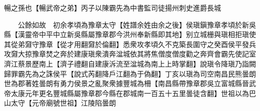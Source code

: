 暢之孫也【暢武帝之弟】丙子以陳霸先為中書監司徒揚州刺史進爵長城

　　公餘如故　初余孝頃為豫章太守【姓譜余姓由余之後】侯瑱鎭豫章孝頃於新吳縣【漢靈帝中平中立新吳縣屬豫章郡今洪州奉新縣即其地】别立城栅與瑱相拒瑱使其從弟奫守豫章【從才用翻奫於倫翻】悉衆攻孝頃久不克築長圍守之癸酉侯平發兵攻奫大掠豫章焚之奔於建康瑱衆潰奔湓城依其將焦僧度僧度勸之奔齊會霸先使記室濟江蔡景歷南上【濟子禮翻自建康泝流至湓城為南上上時掌翻】說瑱令降瑱乃詣闕歸罪霸先為之誅侯平【說式芮翻降戶江翻為于偽翻】丁亥以瑱為司空南昌民熊曇朗世為郡著姓曇朗有勇力侯景之亂聚衆據豐城為柵【南昌縣帶豫章郡吳立富城縣晉武帝太康元年更名豐城縣屬豫章郡今縣在郡城南一百五十五里曇徒含翻】世祖以為巴山太守【元帝廟號世祖】江陵陷曇朗